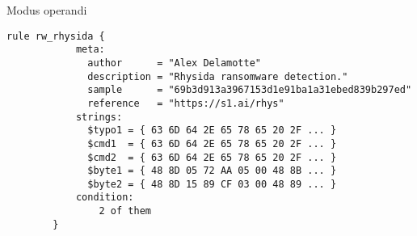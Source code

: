 \documentclass[bookmarks=false,aspectratio=169,9pt]{beamer}
\begin{document}
\begin{frame}[fragile]{Modus operandi}
	\begin{center}
		\begin{lstlisting}[caption=Regras YARA fornecidas pela equipe do SentinelOne]
        rule rw_rhysida {
            meta:
              author      = "Alex Delamotte"
              description = "Rhysida ransomware detection."
              sample      = "69b3d913a3967153d1e91ba1a31ebed839b297ed"
              reference   = "https://s1.ai/rhys"
            strings:
              $typo1 = { 63 6D 64 2E 65 78 65 20 2F ... }
              $cmd1  = { 63 6D 64 2E 65 78 65 20 2F ... }
              $cmd2  = { 63 6D 64 2E 65 78 65 20 2F ... }
              $byte1 = { 48 8D 05 72 AA 05 00 48 8B ... }
              $byte2 = { 48 8D 15 89 CF 03 00 48 89 ... }
            condition:
                2 of them
        }
\end{lstlisting}
	\end{center}
\end{frame}
\end{document}
